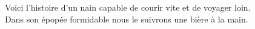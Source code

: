 Voici l'histoire d'un nain capable de courir vite et de voyager loin.\\
Dans son épopée formidable nous le suivrons une bière à la main.\\